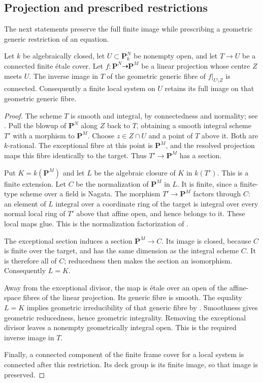 \subsection{Projection and prescribed restrictions}\label{app:projection}
The next statements preserve the full finite image while prescribing a geometric generic restriction of an equation.

\begin{lemma}\label{lem:projection-connected}
Let $k$ be algebraically closed, let $U\subset\mathbf P^N_k$ be nonempty open, and let $T\to U$ be a connected finite \textup{\'etale} cover. Let $f:\mathbf P^N\dashrightarrow\mathbf P^M$ be a linear projection whose centre $Z$ meets $U$. The inverse image in $T$ of the geometric generic fibre of $f|_{U\setminus Z}$ is connected. Consequently a finite local system on $U$ retains its full image on that geometric generic fibre.
\end{lemma}
\begin{proof}
The scheme $T$ is smooth and integral, by connectedness and normality; see \citet[Lemma~58.11.2]{StacksNormal}. Pull the blowup of $\mathbf P^N$ along $Z$ back to $T$, obtaining a smooth integral scheme $T'$ with a morphism to $\mathbf P^M$. Choose $z\in Z\cap U$ and a point of $T$ above it. Both are $k$-rational. The exceptional fibre at this point is $\mathbf P^M$, and the resolved projection maps this fibre identically to the target. Thus $T'\to\mathbf P^M$ has a section.

Put $K=k(\mathbf P^M)$ and let $L$ be the algebraic closure of $K$ in $k(T')$. This is a finite extension. Let $C$ be the normalization of $\mathbf P^M$ in $L$. It is finite, since a finite-type scheme over a field is Nagata. The morphism $T'\to\mathbf P^M$ factors through $C$: an element of $L$ integral over a coordinate ring of the target is integral over every normal local ring of $T'$ above that affine open, and hence belongs to it. These local maps glue. This is the normalization factorization of \citet[Lemma~29.54.4]{StacksNormalization}.

The exceptional section induces a section $\mathbf P^M\to C$. Its image is closed, because $C$ is finite over the target, and has the same dimension as the integral scheme $C$. It is therefore all of $C$; reducedness then makes the section an isomorphism. Consequently $L=K$.

Away from the exceptional divisor, the map is \textup{\'etale} over an open of the affine-space fibres of the linear projection. Its generic fibre is smooth. The equality $L=K$ implies geometric irreducibility of that generic fibre by \citet[Lemma~33.8.6]{StacksGeometric}. Smoothness gives geometric reducedness, hence geometric integrality. Removing the exceptional divisor leaves a nonempty geometrically integral open. This is the required inverse image in $T$.

Finally, a connected component of the finite frame cover for a local system is connected after this restriction. Its deck group is its finite image, so that image is preserved.
\end{proof}

